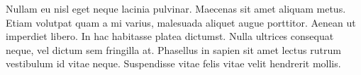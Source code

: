 \documentclass[11pt,a4paper,italian]{article}
\begin{document}
Nullam eu nisl eget neque lacinia pulvinar. Maecenas sit amet aliquam metus. Etiam volutpat quam a mi varius, malesuada aliquet augue porttitor. Aenean ut imperdiet libero. In hac habitasse platea dictumst. Nulla ultrices consequat neque, vel dictum sem fringilla at. Phasellus in sapien sit amet lectus rutrum vestibulum id vitae neque. Suspendisse vitae felis vitae velit hendrerit mollis.
\end{document}
